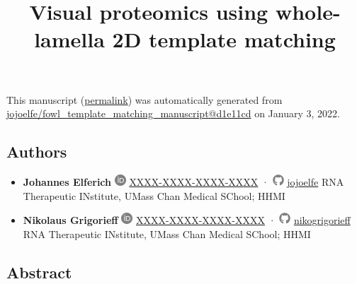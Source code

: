\documentclass[
]{article}
\title{Visual proteomics using whole-lamella 2D template matching}
\author{}
\date{}
\begin{document}
\maketitle

This manuscript
(\href{https://jojoelfe.github.io/fowl_template_matching_manuscript/v/d1e11cd25750e43c45aa7a3781790ef34ec0a49f/}{permalink})
was automatically generated
from \href{https://github.com/jojoelfe/fowl_template_matching_manuscript/tree/d1e11cd25750e43c45aa7a3781790ef34ec0a49f}{jojoelfe/fowl\_template\_matching\_manuscript@d1e11cd}
on January 3, 2022.

\hypertarget{authors}{%
\subsection{Authors}\label{authors}}

\begin{itemize}
\item
  \textbf{Johannes Elferich}
  \includegraphics[width=0.16667in,height=0.16667in]{images/orcid.svg}
  \href{https://orcid.org/XXXX-XXXX-XXXX-XXXX}{XXXX-XXXX-XXXX-XXXX}
  · \includegraphics[width=0.16667in,height=0.16667in]{images/github.svg}
  \href{https://github.com/jojoelfe}{jojoelfe}
  RNA Therapeutic INstitute, UMass Chan Medical SChool; HHMI
\item
  \textbf{Nikolaus Grigorieff}
  \includegraphics[width=0.16667in,height=0.16667in]{images/orcid.svg}
  \href{https://orcid.org/XXXX-XXXX-XXXX-XXXX}{XXXX-XXXX-XXXX-XXXX}
  · \includegraphics[width=0.16667in,height=0.16667in]{images/github.svg}
  \href{https://github.com/nikogrigorieff}{nikogrigorieff}
  RNA Therapeutic INstitute, UMass Chan Medical SChool; HHMI
\end{itemize}

\hypertarget{abstract}{%
\subsection{Abstract}\label{abstract}}
\end{document}
